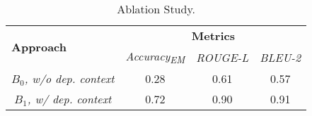 \begin{table}[]
\centering
\begin{tabular}{l|ccc}
\toprule
\multirow{2}{*}{\textbf{Approach}} & \multicolumn{3}{c}{\textbf{Metrics}}                                  \\ \cline{2-4} 
                                   & \multicolumn{1}{c|}{\textit{Accuracy\textsubscript{EM}}} & \multicolumn{1}{c|}{\textit{ROUGE-L}} & \textit{BLEU-2} \\ \hline
\multicolumn{1}{c|}{\textit{$B_0$, w/o dep. context}}      & \multicolumn{1}{c|}{0.28}         & \multicolumn{1}{c|}{0.61}        &  0.57 \\
\multicolumn{1}{c|}{\textit{$B_1$, w/ dep. context}}       & \multicolumn{1}{c|}{0.72}         & \multicolumn{1}{c|}{0.90}        &  0.91 \\ \bottomrule
\end{tabular}
\caption{Ablation Study.}
\label{tab:ablation}
\end{table}